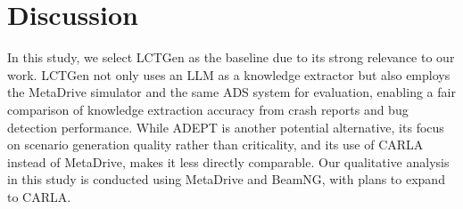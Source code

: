 
\section{Discussion}
\label{sec:discuss}
In this study, we select LCTGen as the baseline due to its strong relevance to our work. LCTGen not only uses an LLM as a knowledge extractor but also employs the MetaDrive simulator and the same ADS system for evaluation, enabling a fair comparison of knowledge extraction accuracy from crash reports and bug detection performance. While ADEPT is another potential alternative, its focus on scenario generation quality rather than criticality, and its use of CARLA instead of MetaDrive, makes it less directly comparable. Our qualitative analysis in this study is conducted using MetaDrive and BeamNG, with plans to expand to CARLA.
\vspace{-2mm}
